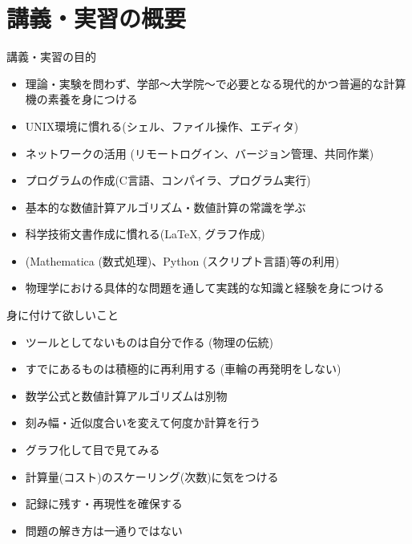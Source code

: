 \section{講義・実習の概要}

\begin{frame}[t]{講義・実習の目的}
  \begin{itemize}
  \item 理論・実験を問わず、学部〜大学院〜で必要となる現代的かつ普遍的な計算機の素養を身につける
  \item {\color{gray}UNIX環境に慣れる(シェル、ファイル操作、エディタ)}
  \item {\color{gray}ネットワークの活用 (リモートログイン、バージョン管理、共同作業)}
  \item {\color{gray}プログラムの作成(C言語、コンパイラ、プログラム実行)}
  \item 基本的な数値計算アルゴリズム・数値計算の常識を学ぶ
  \item {\color{gray}科学技術文書作成に慣れる(\LaTeX, グラフ作成)}
  \item {\color{gray}(Mathematica (数式処理)、Python (スクリプト言語)等の利用)}
  \item {\color{red}物理学における具体的な問題を通して実践的な知識と経験を身につける}
  \end{itemize}
\end{frame}

\begin{frame}[t]{身に付けて欲しいこと}
  \begin{itemize}
  \item ツールとしてないものは自分で作る (物理の伝統)
  \item すでにあるものは積極的に再利用する (車輪の再発明をしない)
  \item 数学公式と数値計算アルゴリズムは別物
  \item 刻み幅・近似度合いを変えて何度か計算を行う
  \item グラフ化して目で見てみる
  \item 計算量(コスト)のスケーリング(次数)に気をつける
  \item 記録に残す・再現性を確保する
  \item {\color{red}問題の解き方は一通りではない}
  \end{itemize}
\end{frame}

